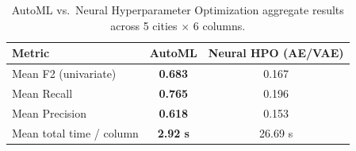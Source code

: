 \documentclass[12pt]{article}
\begin{document}
\begin{table}[H]
\begin{center}
\begin{tabular}{@{}lcc@{}}
\toprule
Metric & AutoML & Neural HPO (AE/VAE) \\
\midrule
Mean F2 (univariate)        & \textbf{0.683} & 0.167 \\
Mean Recall                 & \textbf{0.765} & 0.196 \\
Mean Precision              & \textbf{0.618} & 0.153 \\
Mean total time / column    & \textbf{2.92 s} & 26.69 s \\
\bottomrule
\end{tabular}
\end{center}
\caption{AutoML vs.\ Neural Hyperparameter Optimization aggregate results across 5 cities $\times$ 6 columns.}
\label{tab:autonn_summary}
\end{table}
\end{document}
